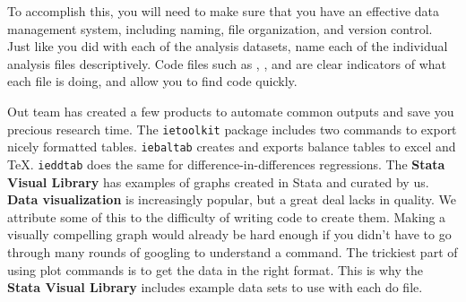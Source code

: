 To accomplish this, you will need to make sure that you have an effective data management system, including naming, file organization, and version control.
Just like you did with each of the analysis datasets, name each of the individual analysis files descriptively.
Code files such as , , and  
are clear indicators of what each file is doing, and allow you to find code quickly.

Out team has created a few products to automate common outputs and save you precious research time.
The \texttt{ietoolkit} package includes two commands to export nicely formatted tables.
\texttt{iebaltab} creates and exports balance tables to excel and {\TeX}. \texttt{ieddtab} does the same for difference-in-differences regressions.
The \textbf{Stata Visual Library}
has examples of graphs created in Stata and curated by us.
\textbf{Data visualization} 
is increasingly popular, but a great deal lacks in quality.\cite{healy2018data,wilke2019fundamentals}
We attribute some of this to the difficulty of writing code to create them.
Making a visually compelling graph would already be hard enough if you didn't have to go through many rounds of googling to understand a command.
The trickiest part of using plot commands is to get the data in the right format.
This is why the \textbf{Stata Visual Library} includes example data sets to use with each do file.

